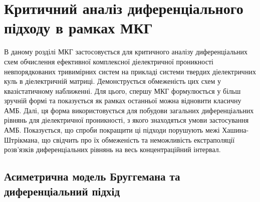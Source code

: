 \documentclass[14pt,twoside]{vakthesis}
\begin{document}
\newpage
\clearpage
\newpage

\chapter{Критичний аналіз диференціального підходу в рамках МКГ}\label{sec:Hanai-analysis}

В даному розділі МКГ застосовується для критичного аналізу диференціальних схем обчислення ефективної комплексної діелектричної проникності невпорядкованих тривимірних систем на прикладі системи твердих діелектричних куль в діелектричній матриці. Демонструється обмеженість цих схем у квазістатичному наближенні. Для цього, спершу МКГ формулюється у більш зручній формі та показується як рамках останньої можна відновити класичну АМБ. Далі, ця форма використовується для побудови загальних диференціальних рівнянь для діелектричної проникності, з якого знаходяться умови застосування АМБ. Показується, що спроби покращити ці підходи порушують межі Хашина-Штрікмана, що свідчить про їх обмеженість та неможливість  екстраполяції розв'язків диференціальних рівнянь на весь концентраційний інтервал.


\section{Асиметрична модель Бруггемана та диференціальний підхід}\label{sec:Hanai-intro}
\end{document}
